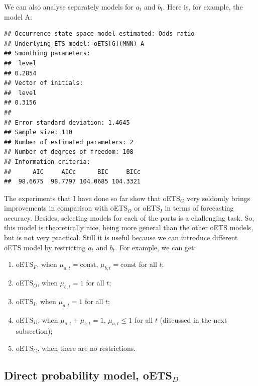 \documentclass[
]{book}
\newenvironment{Shaded}{\begin{snugshade}}{\end{snugshade}}
\newcommand{\NormalTok}[1]{#1}
\newcommand{\SpecialCharTok}[1]{\textcolor[rgb]{0.00,0.00,0.00}{#1}}
\providecommand{\tightlist}{%
  \setlength{\itemsep}{0pt}\setlength{\parskip}{0pt}}
\theoremstyle{definition}
\theoremstyle{definition}
\theoremstyle{definition}
\theoremstyle{definition}
\theoremstyle{remark}
\begin{document}
We can also analyse separately models for \(a_t\) and \(b_t\). Here is, for example, the model A:

\begin{Shaded}
\end{Shaded}

\begin{verbatim}
## Occurrence state space model estimated: Odds ratio
## Underlying ETS model: oETS[G](MNN)_A
## Smoothing parameters:
##  level 
## 0.2854 
## Vector of initials:
##  level 
## 0.3156 
## 
## Error standard deviation: 1.4645
## Sample size: 110
## Number of estimated parameters: 2
## Number of degrees of freedom: 108
## Information criteria: 
##      AIC     AICc      BIC     BICc 
##  98.6675  98.7797 104.0685 104.3321
\end{verbatim}

The experiments that I have done so far show that oETS\(_G\) very seldomly brings improvements in comparison with oETS\(_O\) or oETS\(_I\) in terms of forecasting accuracy. Besides, selecting models for each of the parts is a challenging task. So, this model is theoretically nice, being more general than the other oETS models, but is not very practical. Still it is useful because we can introduce different oETS model by restricting \(a_t\) and \(b_t\). For example, we can get:

\begin{enumerate}
\def\labelenumi{\arabic{enumi}.}
\tightlist
\item
  oETS\(_F\), when \(\mu_{a,t} = \text{const}\), \(\mu_{b,t} = \text{const}\) for all \(t\);
\item
  oETS\(_O\), when \(\mu_{b,t} = 1\) for all \(t\);
\item
  oETS\(_I\), when \(\mu_{a,t} = 1\) for all \(t\);
\item
  oETS\(_D\), when \(\mu_{a,t} + \mu_{b,t} = 1\), \(\mu_{a,t} \leq 1\) for all \(t\) (discussed in the next subsection);
\item
  oETS\(_G\), when there are no restrictions.
\end{enumerate}

\hypertarget{direct-probability-model-oets_d}{%
\subsection{\texorpdfstring{Direct probability model, oETS\(_D\)}{Direct probability model, oETS\_D}}\label{direct-probability-model-oets_d}}
\end{document}
